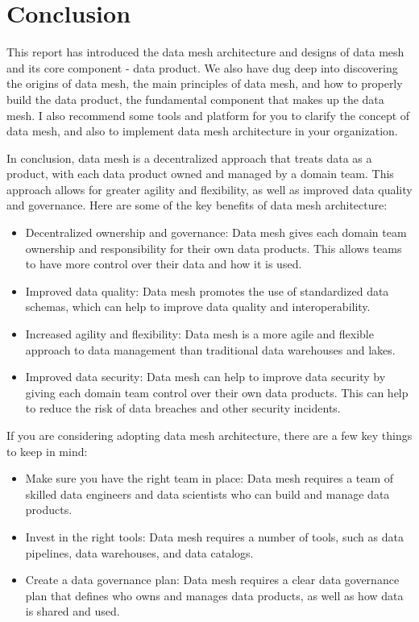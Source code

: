 \documentclass[12pt, a4paper]{book}
\begin{document}
\chapter{Conclusion}
This report has introduced the data mesh architecture and designs of data mesh and its core component - data product. We also have dug deep into discovering the origins of data mesh, the main principles of data mesh, and how to properly build the data product, the fundamental component that makes up the data mesh. I also recommend some tools and platform for you to clarify the concept of data mesh, and also to implement data mesh architecture in your organization.

In conclusion, data mesh is a decentralized approach that treats data as a product, with each data product owned and managed by a domain team. This approach allows for greater agility and flexibility, as well as improved data quality and governance. Here are some of the key benefits of data mesh architecture:
	\begin{itemize}[nosep]
		\item Decentralized ownership and governance: Data mesh gives each domain team ownership and responsibility for their own data products. This allows teams to have more control over their data and how it is used.
		\item Improved data quality: Data mesh promotes the use of standardized data schemas, which can help to improve data quality and interoperability.
		\item Increased agility and flexibility: Data mesh is a more agile and flexible approach to data management than traditional data warehouses and lakes.
		\item Improved data security: Data mesh can help to improve data security by giving each domain team control over their own data products. This can help to reduce the risk of data breaches and other security incidents.
	\end{itemize}
	
If you are considering adopting data mesh architecture, there are a few key things to keep in mind:
	\begin{itemize}[nosep]
		\item Make sure you have the right team in place: Data mesh requires a team of skilled data engineers and data scientists who can build and manage data products.
		\item Invest in the right tools: Data mesh requires a number of tools, such as data pipelines, data warehouses, and data catalogs.
		\item Create a data governance plan: Data mesh requires a clear data governance plan that defines who owns and manages data products, as well as how data is shared and used.
	\end{itemize}
\end{document}
